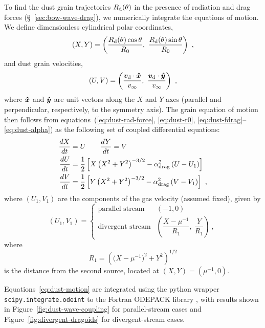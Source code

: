 To find the dust grain trajectories \(R_{\text{d}}(\theta)\) in the presence of
radiation and drag forces (\S~\ref{sec:bow-wave-drag}), we numerically
integrate the equations of motion. We define dimensionless cylindrical
polar coordinates,
\begin{equation}
  \label{eq:dust-XY}
  (X, Y) = \left(\frac{R\grain(\theta) \cos\theta } {R_0}, \ 
    \frac{R\grain(\theta) \sin\theta } {R_0}\right)
  \ ,
\end{equation}
and dust grain velocities,
\begin{equation}
  \label{eq:dust-UV}
  (U, V) = \left( \frac{\bm{v}\grain \cdot \uvec{x}} {v_\infty}, \ 
  \frac{\bm{v}\grain \cdot \uvec{y}} {v_\infty}\right) \ ,
\end{equation}
where \(\bm{\hat{x}}\) and \(\bm{\hat{y}}\) are unit vectors along the \(X\)
and \(Y\) axes (parallel and perpendicular, respectively, to the
symmetry axis).  The grain equation of motion then follows from
equations~(\ref{eq:dust-rad-force}, \ref{eq:dust-r0},
\ref{eq:dust-fdrag}--\ref{eq:dust-alpha}) as the following set of
coupled differential equations:
\begin{gather}
  \label{eq:dust-motion}
  \begin{aligned}
    \frac{d X}{d t} &= U \quad\quad
    \frac{d Y}{d t} = V \\
    \frac{d U}{d t} &= \frac12 \left[  
      X \left(X^2 + Y^2\right)^{-3/2} - \alpha_{\text{drag}}^2 \left(U - U_1\right)
    \right] \\
    \frac{d V}{d t} &= \frac12 \left[  
      Y \left(X^2 + Y^2\right)^{-3/2} - \alpha_{\text{drag}}^2 \left(V - V_1\right)
    \right] \ ,
  \end{aligned}
\end{gather}
where \((U_1, V_1)\) are the components of the gas velocity (assumed
fixed), given by
\begin{equation}
  \label{eq:dust-gas-velocities}
  (U_1, V_1) = 
  \begin{cases}
    \text{parallel stream} & (-1, 0)\\
    \text{divergent stream} &
    \left( \dfrac{X - \mu^{-1}}{R_1},\ \dfrac{Y}{R_1}\right) \ ,
  \end{cases}
\end{equation}
where
\begin{equation}
  \label{eq:dust-R1}
  R_1 = \left( \bigl(X - \mu^{-1}\bigr)^2 + Y^2 \right)^{1/2}
\end{equation}
is the distance from the second source, located at
\((X, Y) = (\mu^{-1}, 0)\).

Equations~\eqref{eq:dust-motion} are integrated using the python
wrapper \texttt{scipy.integrate.odeint} to the Fortran ODEPACK library
\citep{Hindmarsh:1983a, Jones:2001a}, with results shown in
Figure~\ref{fig:dust-wave-coupling} for parallel-stream cases and
Figure~\ref{fig:divergent-dragoids} for divergent-stream cases. 

